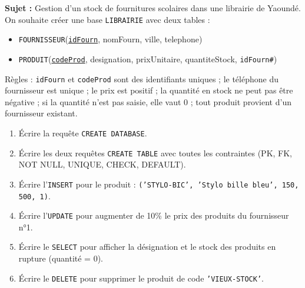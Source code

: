 \documentclass[11pt]{article}
\begin{document}
\begin{exercice}
\textbf{Sujet :} Gestion d'un stock de fournitures scolaires dans une librairie de Yaoundé.
On souhaite créer une base \texttt{LIBRAIRIE} avec deux tables :
\begin{itemize}
\item \texttt{FOURNISSEUR}(\underline{\texttt{idFourn}}, nomFourn, ville, telephone)
\item \texttt{PRODUIT}(\underline{\texttt{codeProd}}, designation, prixUnitaire, quantiteStock, \texttt{idFourn\#})
\end{itemize}
Règles : \texttt{idFourn} et \texttt{codeProd} sont des identifiants uniques ; le téléphone du fournisseur est unique ; le prix est positif ; la quantité en stock ne peut pas être négative ; si la quantité n'est pas saisie, elle vaut 0 ; tout produit provient d'un fournisseur existant.

\begin{enumerate}
\item Écrire la requête \texttt{CREATE DATABASE}.
\item Écrire les deux requêtes \texttt{CREATE TABLE} avec toutes les contraintes (PK, FK, NOT NULL, UNIQUE, CHECK, DEFAULT).
\item Écrire l'\texttt{INSERT} pour le produit : \texttt{('STYLO-BIC', 'Stylo bille bleu', 150, 500, 1)}.
\item Écrire l'\texttt{UPDATE} pour augmenter de 10\% le prix des produits du fournisseur n°1.
\item Écrire le \texttt{SELECT} pour afficher la désignation et le stock des produits en rupture (quantité = 0).
\item Écrire le \texttt{DELETE} pour supprimer le produit de code \texttt{'VIEUX-STOCK'}.
\end{enumerate}
\end{exercice}
\end{document}
